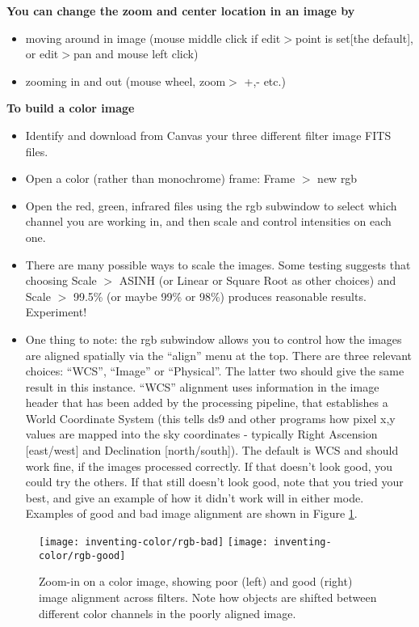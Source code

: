 \textbf{You can change the zoom and center location in an image by} 
\begin{itemize}
\item moving around in image (mouse middle click if edit$>$point is set[the default], or edit$>$pan and mouse left click)
\item zooming in and out (mouse wheel, zoom$>$ +,- etc.)
\end{itemize}

\textbf{To build a color image}
\begin{itemize}
	\item Identify and download from Canvas your three different filter image FITS files.
\item Open a color (rather than monochrome) frame:  Frame $>$ new rgb
\item Open the red, green, infrared files using the rgb subwindow to select which channel you are working in, and then scale and control intensities on each one. 
\item There are many possible ways to scale the images. Some testing suggests that choosing Scale $>$ ASINH (or Linear or Square Root as other choices) and Scale $>$ 99.5\% (or maybe 99\% or 98\%)  produces reasonable results. Experiment!
\item One thing to note: the rgb subwindow allows you to control how the images are aligned spatially via the “align” menu at the top. There are three relevant choices: “WCS”, “Image” or “Physical”.  The latter two should give the same result in this instance. “WCS” alignment uses information in the image header that has been added by the processing pipeline, that establishes a World Coordinate System (this tells ds9 and other programs how pixel x,y values are mapped into the sky coordinates - typically Right Ascension [east/west] and Declination [north/south]). The default is WCS and should work fine, if the images processed correctly. If that doesn’t look good, you could try the others. If that still doesn’t look good, note that you tried your best, and give an example of how it didn’t work will in either mode. Examples of good and bad image alignment are shown in Figure \ref{ic:fig:rgb-bad}.
\end{itemize}

\begin{figure}
	\texttt{[image: inventing-color/rgb-bad]}
	\texttt{[image: inventing-color/rgb-good]}
	\caption{Zoom-in on a color image, showing poor (left) and good (right) image alignment across filters. Note how objects are shifted between different color channels in the poorly aligned image.}\label{ic:fig:rgb-bad}
\end{figure}

